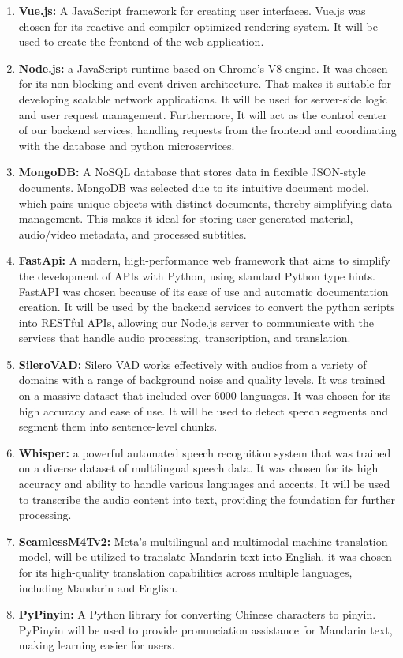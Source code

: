 \documentclass[oneside]{utmthesis}
\begin{document}
\begin{enumerate}[label= (\alph*)]
    \item \textbf{Vue.js:} A JavaScript framework for creating user interfaces.  Vue.js was chosen for its reactive and compiler-optimized rendering system. It will be used to create the frontend of the web application.
    \item \textbf{Node.js:} a JavaScript runtime based on Chrome's V8 engine. It was chosen for its non-blocking and event-driven architecture. That makes it suitable for developing scalable network applications. It will be used for server-side logic and user request management. Furthermore, It will act as the control center of our backend services, handling requests from the frontend and coordinating with the database and python microservices.
    \item \textbf{MongoDB:} A NoSQL database that stores data in flexible JSON-style documents.  MongoDB was selected due to its intuitive document model, which pairs unique objects with distinct documents, thereby simplifying data management. This makes it ideal for storing user-generated material, audio/video metadata, and processed subtitles.
    \item \textbf{FastApi:} A modern, high-performance web framework that aims to simplify the development of APIs with Python, using standard Python type hints. FastAPI was chosen because of its ease of use and automatic documentation creation. It will be used by the backend services to convert the python scripts into RESTful APIs, allowing our Node.js server to communicate with the services that handle audio processing, transcription, and translation.
    \item \textbf{SileroVAD:} Silero VAD works effectively with audios from a variety of domains with a range of background noise and quality levels. It was trained on a massive dataset that included over 6000 languages. It was chosen for its high accuracy and ease of use. It will be used to detect speech segments and segment them into sentence-level chunks.
    \item \textbf{Whisper:} a powerful automated speech recognition system that was trained on a diverse dataset of multilingual speech data. It was chosen for its high accuracy and ability to handle various languages and accents. It will be used to transcribe the audio content into text, providing the foundation for further processing.
    \item \textbf{SeamlessM4Tv2:} Meta's multilingual and multimodal machine translation model, will be utilized to translate Mandarin text into English.  it was chosen for its high-quality translation capabilities across multiple languages, including Mandarin and English.
    \item \textbf{PyPinyin:} A Python library for converting Chinese characters to pinyin.  PyPinyin will be used to provide pronunciation assistance for Mandarin text, making learning easier for users.
\end{enumerate}
\end{document}
